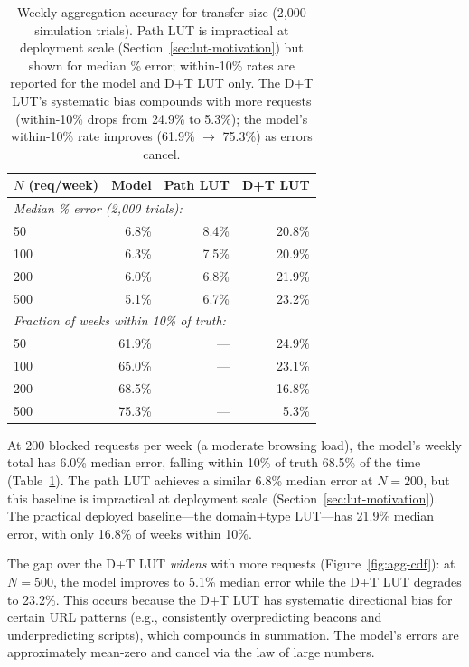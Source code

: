 \documentclass[sigconf,nonacm]{acmart}
\begin{document}
\begin{table}[t]
\centering
\small
\begin{tabular}{lrrr}
\toprule
$N$ (req/week) & Model & Path LUT & D+T LUT \\
\midrule
\multicolumn{4}{l}{\emph{Median \% error (2,000 trials):}} \\
50  & 6.8\% & 8.4\% & 20.8\% \\
100 & 6.3\% & 7.5\% & 20.9\% \\
200 & 6.0\% & 6.8\% & 21.9\% \\
500 & 5.1\% & 6.7\% & 23.2\% \\
\midrule
\multicolumn{4}{l}{\emph{Fraction of weeks within 10\% of truth:}} \\
50  & 61.9\% & --- & 24.9\% \\
100 & 65.0\% & --- & 23.1\% \\
200 & 68.5\% & --- & 16.8\% \\
500 & 75.3\% & --- & 5.3\% \\
\bottomrule
\end{tabular}
\caption{Weekly aggregation accuracy for transfer size (2,000 simulation trials). Path LUT is impractical at deployment scale (Section~\ref{sec:lut-motivation}) but shown for median \% error; within-10\% rates are reported for the model and D+T LUT only. The D+T LUT's systematic bias compounds with more requests (within-10\% drops from 24.9\% to 5.3\%); the model's within-10\% rate improves (61.9\% $\to$ 75.3\%) as errors cancel.}
\label{tab:aggregation}
\end{table}

At 200 blocked requests per week (a moderate browsing load), the model's weekly total has 6.0\% median error, falling within 10\% of truth 68.5\% of the time (Table~\ref{tab:aggregation}).
The path LUT achieves a similar 6.8\% median error at $N=200$, but this baseline is impractical at deployment scale (Section~\ref{sec:lut-motivation}).
The practical deployed baseline---the domain+type LUT---has 21.9\% median error, with only 16.8\% of weeks within 10\%.

The gap over the D+T LUT \emph{widens} with more requests (Figure~\ref{fig:agg-cdf}): at $N=500$, the model improves to 5.1\% median error while the D+T LUT degrades to 23.2\%.
This occurs because the D+T LUT has systematic directional bias for certain URL patterns (e.g., consistently overpredicting beacons and underpredicting scripts), which compounds in summation.
The model's errors are approximately mean-zero and cancel via the law of large numbers.
\end{document}
